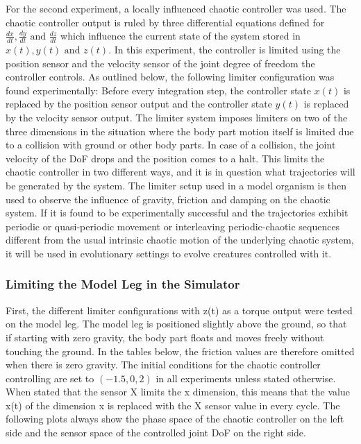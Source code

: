 \documentclass[main]{subfiles}
\begin{document}
For the second experiment, a locally influenced chaotic controller was used. %
%
The chaotic controller output is ruled by three differential equations defined for \(\frac{dx}{dt},\frac{dy}{dt} \text{ and } \frac{dz}{dt}\) which influence the current state of the system stored in \(x(t),y(t) \text{ and } z(t)\). %
%
In this experiment, the controller is limited using the position sensor and the velocity sensor of the joint degree of freedom the controller controls. %
%
As outlined below, the following limiter configuration was found experimentally: Before every integration step, the controller state \(x(t)\) is replaced by the position sensor output and the controller state \(y(t)\) is replaced by the velocity sensor output. %
%
The limiter system imposes limiters on two of the three dimensions in the situation where the body part motion itself is limited due to a collision with ground or other body parts. %
%
In case of a collision, the joint velocity of the DoF drops and the position comes to a halt. %
%
This limits the chaotic controller in two different ways, and it is in question what trajectories will be generated by the system. %
%
The limiter setup used in a model organism is then used to observe the influence of gravity, friction and damping on the chaotic system. %
%
If it is found to be experimentally successful and the trajectories exhibit periodic or quasi-periodic movement or interleaving periodic-chaotic sequences different from the usual intrinsic chaotic motion of the underlying chaotic system, it will be used in evolutionary settings to evolve creatures controlled with it.

\subsubsection{Limiting the Model Leg in the Simulator}
\label{subsubsec:limiting-the-model-leg}

First, the different limiter configurations with z(t) as a torque output were tested on the model leg. %
%
The model leg is positioned slightly above the ground, so that if starting with zero gravity, the body part floats and moves freely without touching the ground. %
%
In the tables below, the friction values are therefore omitted when there is zero gravity. %
%
The initial conditions for the chaotic controller controlling are set to \((-1.5,0,2)\) in all experiments unless stated otherwise. %
%
When stated that the sensor X limits the x dimension, this means that the value x(t) of the dimension x is replaced with the X sensor value in every cycle. %
%
The following plots always show the phase space of the chaotic controller on the left side and the sensor space of the controlled joint DoF on the right side.
\end{document}
